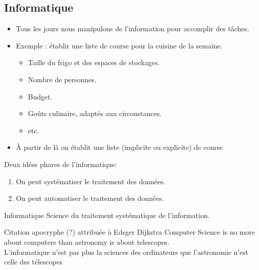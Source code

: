 \documentclass{beamer}
\begin{document}
\subsection{Informatique}

\begin{frame}
	\begin{itemize}
	\item Tous les jours nous manipulons de l'information pour accomplir des tâches.
	\item Exemple : établir une liste de course pour la cuisine de la semaine.
		
		\begin{itemize}
			\item Taille du frigo et des espaces de stockages.
			\item Nombre de personnes.
			\item Budget.
			\item Goûts culinaire, adaptés aux circonstances.
			\item etc.
		\end{itemize}
	\item À partir de là on établit une liste (implicite ou explicite) de course
	
	\end{itemize}
\end{frame}

\begin{slide}

Deux idées phares de l'informatique:
	\begin{enumerate}
		\item On peut systématiser le traitement des données.
		\item On peut automatiser le traitement des données.
	\end{enumerate}
\end{slide}

\begin{slide}

	
	
	\begin{block}{Informatique}
	Science du traitement systématique de l'information.
	\end{block}
	
	
	\begin{exampleblock}{Citation apocryphe (?) attribuée à Edsger Dijkstra}%
	Computer Science is no more about computers than astronomy is about telescopes.\\
	
	L'informatique n'est pas plus la sciences des ordinateurs que l'astronomie n'est celle des télescopes
	\end{exampleblock}
	
\end{slide}
\end{document}
